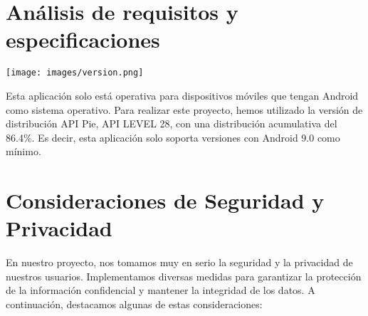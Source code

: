 \documentclass{article}
\begin{document}
\section{Análisis de requisitos y especificaciones}

    \begin{minipage}{0.4\textwidth}
        \texttt{[image: images/version.png]}
    \end{minipage}
    \hfill
    \begin{minipage}{0.55\textwidth}
    Esta aplicación solo está operativa para dispositivos móviles que tengan Android como sistema operativo. Para realizar este proyecto, hemos utilizado la versión de distribución API Pie, API LEVEL 28, con una distribución acumulativa del 86.4\%. Es decir, esta aplicación solo soporta versiones con Android 9.0 como mínimo.
    \end{minipage}

\section{Consideraciones de Seguridad y Privacidad}

    En nuestro proyecto, nos tomamos muy en serio la seguridad y la privacidad de nuestros usuarios. Implementamos diversas medidas para garantizar la protección de la información confidencial y mantener la integridad de los datos. A continuación, destacamos algunas de estas consideraciones:
    
\end{document}
